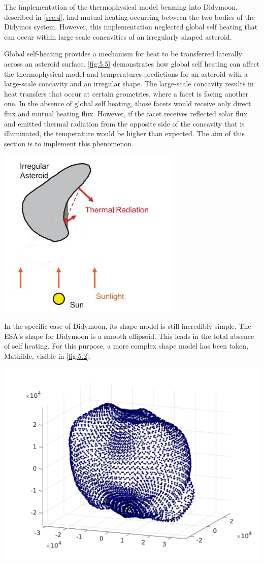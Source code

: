 The implementation of the thermophysical model beaming into Didymoon, described in \autoref{sec:4}, had mutual-heating occurring between the two bodies of the Didymos system. However, this implementation neglected global self heating that can occur within large-scale concavities of an irregularly shaped asteroid.

Global self-heating provides a mechanism for heat to be transferred laterally across an asteroid surface. \autoref{fig:5.5} demonstrates how global self heating can affect the thermophysical model and temperatures predictions for an asteroid with a large-scale concavity and an irregular shape. The large-scale concavity results in heat transfers that occur at certain geometries, where a facet is facing another one. In the absence of global self heating, those facets would receive only direct flux and mutual heating flux. However, if the facet receives reflected solar flux and emitted thermal radiation from the opposite side of the concavity that is illuminated, the temperature would be higher than expected. The aim of this section is to implement this phenomenon.

\begin{center}
    \includegraphics[width=0.5\linewidth]{rsc/self.jpg}
    \label{fig:5.1}
\end{center}

In the specific case of Didymoon, its shape model is still incredibly simple. The ESA's shape for Didymoon is a smooth ellipsoid. This leads in the total absence of self heating. For this purpose, a more complex shape model has been taken, Mathilde, visible in \autoref{fig:5.2}.
\begin{center}
    \includegraphics[width=0.7\linewidth]{rsc/mathilde.png}
    \label{fig:5.2}
\end{center}

